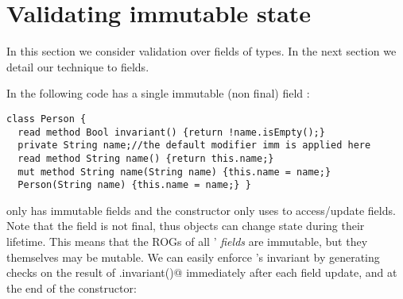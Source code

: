 
%

\section{Validating immutable state}
\label{s:immState}
In this section we consider validation over fields of \Q@imm@ types.
In the next section we detail our technique to \Q@capsule@ fields.

In the following code \Q@Person@ has a single immutable (non final) field \Q@name@:
\begin{lstlisting}
class Person {
  read method Bool invariant() {return !name.isEmpty();}
  private String name;//the default modifier imm is applied here
  read method String name() {return this.name;}
  mut method String name(String name) {this.name = name;}
  Person(String name) {this.name = name;} }
\end{lstlisting}
\Q@Person@ only has immutable fields and the constructor only uses \Q@this@ to access/update fields.
Note that the \Q@name@ field is not final, thus \Q@Person@ objects can change state during their lifetime. This means that the ROGs of all \Q@Person@s' \emph{fields} are immutable, but they themselves may be mutable.
We can easily enforce \Q@Person@'s invariant by generating checks on the result of \Q@this.invariant()@ immediately after each field update, and at the end of the constructor:%

